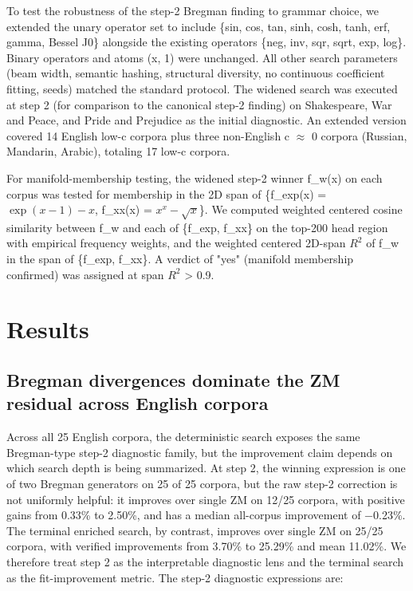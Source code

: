 \documentclass[11pt]{article}
\begin{document}
To test the robustness of the step-2 Bregman finding to grammar choice, we extended the unary operator set to include \{sin, cos, tan, sinh, cosh, tanh, erf, gamma, Bessel J0\} alongside the existing operators \{neg, inv, sqr, sqrt, exp, log\}. Binary operators and atoms (x, 1) were unchanged. All other search parameters (beam width, semantic hashing, structural diversity, no continuous coefficient fitting, seeds) matched the standard protocol. The widened search was executed at step 2 (for comparison to the canonical step-2 finding) on Shakespeare, War and Peace, and Pride and Prejudice as the initial diagnostic. An extended version covered 14 English low-c corpora plus three non-English c $\approx$ 0 corpora (Russian, Mandarin, Arabic), totaling 17 low-c corpora.

For manifold-membership testing, the widened step-2 winner f\_w(x) on each corpus was tested for membership in the 2D span of \{f\_exp(x) = $\exp(x-1)-x$, f\_xx(x) = $x^x-\sqrt{x}$\}. We computed weighted centered cosine similarity between f\_w and each of \{f\_exp, f\_xx\} on the top-200 head region with empirical frequency weights, and the weighted centered 2D-span $R^2$ of f\_w in the span of \{f\_exp, f\_xx\}. A verdict of "yes" (manifold membership confirmed) was assigned at span $R^2$ > 0.9.

\section{Results}

\subsection{Bregman divergences dominate the ZM residual across English corpora}\label{sec:3-1-bregman}

Across all 25 English corpora, the deterministic search exposes the same Bregman-type step-2 diagnostic family, but the improvement claim depends on which search depth is being summarized. At step 2, the winning expression is one of two Bregman generators on 25 of 25 corpora, but the raw step-2 correction is not uniformly helpful: it improves over single ZM on 12/25 corpora, with positive gains from 0.33\% to 2.50\%, and has a median all-corpus improvement of −0.23\%. The terminal enriched search, by contrast, improves over single ZM on 25/25 corpora, with verified improvements from 3.70\% to 25.29\% and mean 11.02\%. We therefore treat step 2 as the interpretable diagnostic lens and the terminal search as the fit-improvement metric. The step-2 diagnostic expressions are:
\end{document}
